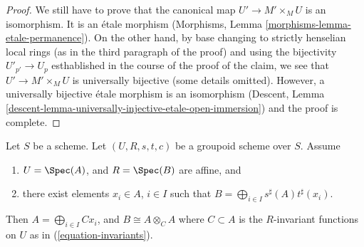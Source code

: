 \begin{proof}
\medskip\noindent
We still have to prove that the canonical map $U' \to M' \times_M U$
is an isomorphism. It is an \'etale morphism
(Morphisms, Lemma \ref{morphisms-lemma-etale-permanence}).
On the other hand, by base changing to strictly henselian local rings
(as in the third paragraph of the proof) and using the bijectivity
$U'_{p'} \to U_p$ esthablished in the course of the proof of the claim,
we see that $U' \to M' \times_M U$ is universally bijective
(some details omitted). However, a universally bijective
\'etale morphism is an isomorphism
(Descent, Lemma \ref{descent-lemma-universally-injective-etale-open-immersion})
and the proof is complete.
\end{proof}

\begin{lemma}
\label{lemma-basis}
Let $S$ be a scheme.
Let $(U, R, s, t, c)$ be a groupoid scheme over $S$.
Assume
\begin{enumerate}
\item $U = \Spec(A)$, and $R = \Spec(B)$ are affine, and
\item there exist elements $x_i \in A$, $i \in I$ such that
$B = \bigoplus_{i \in I} s^\sharp(A)t^\sharp(x_i)$.
\end{enumerate}
Then $A = \bigoplus_{i\in I} Cx_i$, and $B \cong A \otimes_C A$
where $C \subset A$ is the $R$-invariant
functions on $U$ as in (\ref{equation-invariants}).
\end{lemma}

